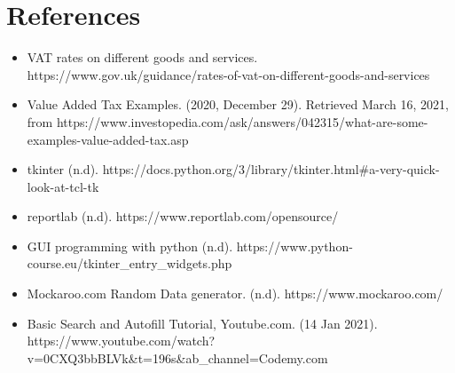 \documentclass[fontsize=11pt]{article}
\begin{document}
    \section*{References}
    \noindent
    \begin{itemize}
        \item VAT rates on different goods and services. https://www.gov.uk/guidance/rates-of-vat-on-different-goods-and-services
        \item Value Added Tax Examples. (2020, December 29). Retrieved March 16, 2021, from https://www.investopedia.com/ask/answers/042315/what-are-some-examples-value-added-tax.asp
        \item tkinter (n.d). https://docs.python.org/3/library/tkinter.html#a-very-quick-look-at-tcl-tk
        \item reportlab (n.d). https://www.reportlab.com/opensource/
        \item GUI programming with python (n.d). https://www.python-course.eu/tkinter\_entry\_widgets.php
        \item Mockaroo.com Random Data generator. (n.d). https://www.mockaroo.com/
        \item Basic Search and Autofill Tutorial, Youtube.com. (14 Jan 2021). https://www.youtube.com/watch?v=0CXQ3bbBLVk&t=196s&ab\_channel=Codemy.com
    \end{itemize}

\end{document}
